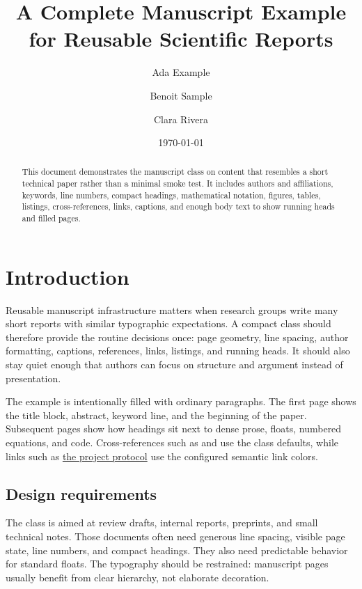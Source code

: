 \documentclass[\oritoneexamplemode,11pt]{oritone-manuscript}
\title{A Complete Manuscript Example for Reusable Scientific Reports}
\author[1]{Ada Example}
\author[1,2]{Benoit Sample}
\author[2]{Clara Rivera}
\affil[1]{Department of Applied Typesetting, Example University}
\affil[2]{Institute for Reusable Documents, Sample Laboratory}
\date{\today}
\begin{document}
\maketitle

\begin{abstract}
This document demonstrates the manuscript class on content that resembles a
short technical paper rather than a minimal smoke test. It includes authors and
affiliations, keywords, line numbers, compact headings, mathematical notation,
figures, tables, listings, cross-references, links, captions, and enough body
text to show running heads and filled pages.
\end{abstract}


\modulolinenumbers[5]
\linenumbers

\section{Introduction}
\label{sec:introduction}

Reusable manuscript infrastructure matters when research groups write many
short reports with similar typographic expectations. A compact class should
therefore provide the routine decisions once: page geometry, line spacing,
author formatting, captions, references, links, listings, and running heads. It
should also stay quiet enough that authors can focus on structure and argument
instead of presentation.

The example is intentionally filled with ordinary paragraphs. The first page
shows the title block, abstract, keyword line, and the beginning of the paper.
Subsequent pages show how headings sit next to dense prose, floats, numbered
equations, and code. Cross-references such as  and
 use the class defaults, while links such as
\href{https://example.com/protocol}{the project protocol} use the configured
semantic link colors.

\subsection{Design requirements}

The class is aimed at review drafts, internal reports, preprints, and small
technical notes. Those documents often need generous line spacing, visible page
state, line numbers, and compact headings. They also need predictable behavior
for standard floats. The typography should be restrained: manuscript pages
usually benefit from clear hierarchy, not elaborate decoration.
\end{document}
